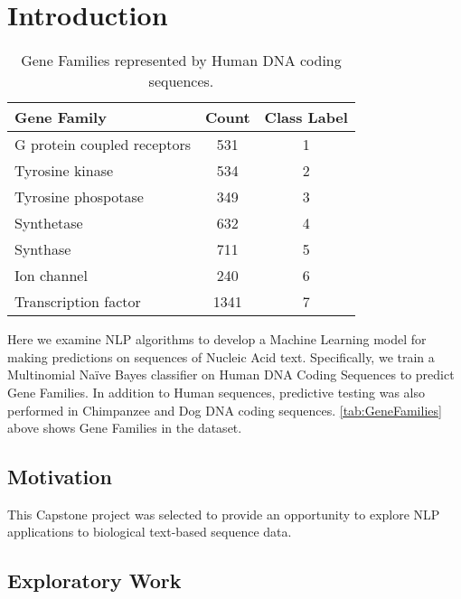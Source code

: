 \section{Introduction}

\begin{table}[tb]
  \centering
  \begin{tabular}{lSS}
    \toprule
    \textbf{Gene Family}      & \textbf{Count} & \textbf{Class Label}\\
    \midrule
    G protein coupled receptors	 & 531 & 1\\
    Tyrosine kinase	 & 534	 & 2\\
    Tyrosine phospotase	 & 349	 & 3\\
    Synthetase	 & 632	 & 4\\
    Synthase	 & 711	 & 5\\
    Ion channel	 & 240	 & 6\\
    Transcription factor	 & 1341	 & 7\\
    \bottomrule
  \end{tabular}
  \caption{
    Gene Families represented by Human DNA coding sequences.
  }
  \label{tab:GeneFamilies}
\end{table}

Here we examine NLP algorithms to develop a Machine Learning model for making predictions on sequences of Nucleic Acid text. Specifically, we train a Multinomial Na\"ive Bayes classifier on Human DNA Coding Sequences to predict Gene Families. In addition to Human sequences, predictive testing was also performed in Chimpanzee and Dog DNA coding sequences.
%
\autoref{tab:GeneFamilies} above shows Gene Families in the dataset.

\subsection{Motivation}

This Capstone project was selected to provide an opportunity to explore NLP applications to biological text-based sequence data.


\subsection{Exploratory Work}

